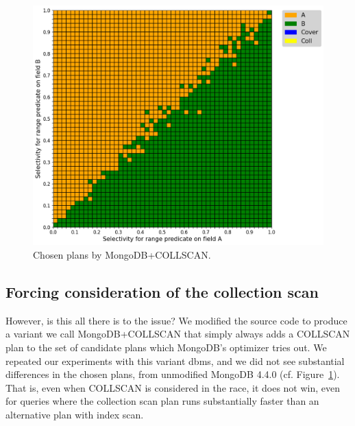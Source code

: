 \begin{figure}[htb]
    \centering
    \includegraphics[width=0.9\columnwidth]{images/results-without-covering-index/mongo-with-coll/72169da5f0334b6c8f1c9de4ed9b7248_mongo_choice.png}
    \caption{Chosen plans by MongoDB+COLLSCAN.}
    \label{fig:mongo-v1-bothindexed-choices}
\end{figure}

\subsection{Forcing consideration of the collection scan}
However, is this all there is to the issue? We modified the source code to produce a variant we call MongoDB+COLLSCAN that simply always adds a COLLSCAN plan to the set of candidate plans which MongoDB's \approachName optimizer tries out. We repeated our experiments with this variant dbms, and we did not see substantial differences in the chosen plans, from unmodified MongoDB 4.4.0 (cf. Figure~\ref{fig:mongo-v1-bothindexed-choices}). That is, even when COLLSCAN is considered in the \approachName race, it does not win, even for queries where the collection scan plan runs substantially faster than an alternative plan with index scan.



